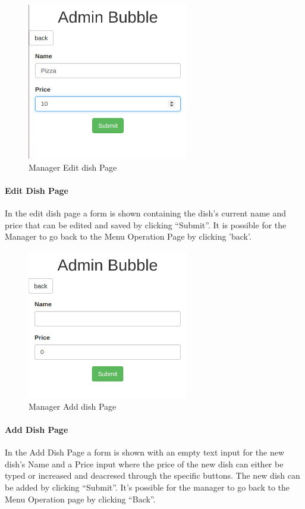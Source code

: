 \begin{figure}[H]
	\centering
	\includegraphics[width=7cm]{../../documenti/UserManualDemo/demo_screens/admin_edit.png}
	\caption{Manager Edit dish Page}
\end{figure}
\paragraph{Edit Dish Page}
In the edit dish page a form is shown containing the dish's current name and price that can be edited and saved by clicking ``Submit''.
It is possible for the Manager to go back to the Menu Operation Page by clicking 'back'.

\begin{figure}[H]
	\centering
	\includegraphics[width=7cm]{../../documenti/UserManualDemo/demo_screens/admin_add.png}
	\caption{Manager Add dish Page}
\end{figure}
\paragraph{Add Dish Page}
In the Add Dish Page a form is shown with an empty text input for the new dish's Name and a Price input where the price of the new dish can either be typed or increased and deacresed through the specific buttons. The new dish can be added by clicking ``Submit''.
It's possible for the manager to go back to the Menu Operation page by clicking ``Back''.

